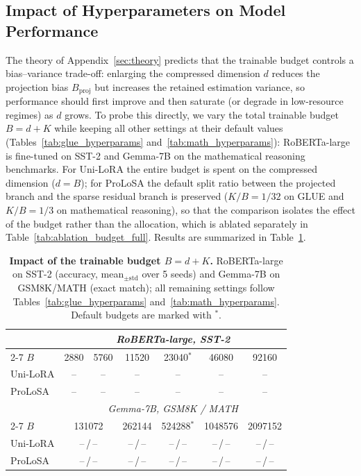 \subsection{Impact of Hyperparameters on Model Performance}
\label{app:hyperparam_d}

The theory of Appendix~\ref{sec:theory} predicts that the trainable budget controls a bias--variance trade-off: enlarging the compressed dimension $d$ reduces the projection bias $B_{\mathrm{proj}}$ but increases the retained estimation variance, so performance should first improve and then saturate (or degrade in low-resource regimes) as $d$ grows.
To probe this directly, we vary the total trainable budget $B=d+K$ while keeping all other settings at their default values (Tables~\ref{tab:glue_hyperparams} and~\ref{tab:math_hyperparams}): RoBERTa-large is fine-tuned on SST-2 and Gemma-7B on the mathematical reasoning benchmarks.
For Uni-LoRA the entire budget is spent on the compressed dimension ($d=B$); for ProLoSA the default split ratio between the projected branch and the sparse residual branch is preserved ($K/B=1/32$ on GLUE and $K/B=1/3$ on mathematical reasoning), so that the comparison isolates the effect of the budget rather than the allocation, which is ablated separately in Table~\ref{tab:ablation_budget_full}.
Results are summarized in Table~\ref{tab:d_sweep}.

\begin{table}[htbp]
\centering
\small
\setlength{\tabcolsep}{4pt}
\caption{\textbf{Impact of the trainable budget $B=d+K$.} RoBERTa-large on SST-2 (accuracy, mean$_{\pm\mathrm{std}}$ over 5 seeds) and Gemma-7B on GSM8K/MATH (exact match); all remaining settings follow Tables~\ref{tab:glue_hyperparams} and~\ref{tab:math_hyperparams}. Default budgets are marked with $^\ast$.}
\label{tab:d_sweep}
\begin{tabular}{lcccccc}
\toprule
& \multicolumn{6}{c}{\emph{RoBERTa-large, SST-2}} \\
\cmidrule(lr){2-7}
$B$ & 2880 & 5760 & 11520 & 23040$^\ast$ & 46080 & 92160 \\
\midrule
Uni-LoRA & -- & -- & -- & -- & -- & -- \\
ProLoSA  & -- & -- & -- & -- & -- & -- \\
\midrule
& \multicolumn{6}{c}{\emph{Gemma-7B, GSM8K / MATH}} \\
\cmidrule(lr){2-7}
$B$ & \multicolumn{2}{c}{131072} & 262144 & 524288$^\ast$ & 1048576 & 2097152 \\
\midrule
Uni-LoRA & \multicolumn{2}{c}{--\,/\,--} & --\,/\,-- & --\,/\,-- & --\,/\,-- & --\,/\,-- \\
ProLoSA  & \multicolumn{2}{c}{--\,/\,--} & --\,/\,-- & --\,/\,-- & --\,/\,-- & --\,/\,-- \\
\bottomrule
\end{tabular}
\end{table}


